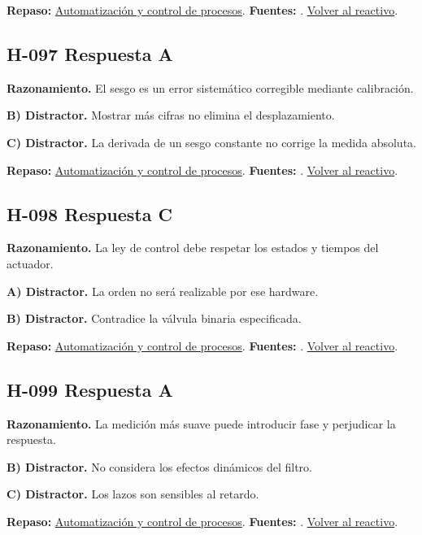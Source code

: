 \textbf{Repaso:} \hyperref[sec:h4]{Automatización y control de procesos}. \textbf{Fuentes:} \cite{control,signals,pid}. \hyperref[q:H-096]{Volver al reactivo}.\par\medskip

\subsection*{H-097 \quad Respuesta A}\label{s:H-097}
\textbf{Razonamiento.} El sesgo es un error sistemático corregible mediante calibración.

\textbf{B) Distractor. }Mostrar más cifras no elimina el desplazamiento.

\textbf{C) Distractor. }La derivada de un sesgo constante no corrige la medida absoluta.

\textbf{Repaso:} \hyperref[sec:h4]{Automatización y control de procesos}. \textbf{Fuentes:} \cite{control,signals,pid}. \hyperref[q:H-097]{Volver al reactivo}.\par\medskip

\subsection*{H-098 \quad Respuesta C}\label{s:H-098}
\textbf{Razonamiento.} La ley de control debe respetar los estados y tiempos del actuador.

\textbf{A) Distractor. }La orden no será realizable por ese hardware.

\textbf{B) Distractor. }Contradice la válvula binaria especificada.

\textbf{Repaso:} \hyperref[sec:h4]{Automatización y control de procesos}. \textbf{Fuentes:} \cite{control,signals,pid}. \hyperref[q:H-098]{Volver al reactivo}.\par\medskip

\subsection*{H-099 \quad Respuesta A}\label{s:H-099}
\textbf{Razonamiento.} La medición más suave puede introducir fase y perjudicar la respuesta.

\textbf{B) Distractor. }No considera los efectos dinámicos del filtro.

\textbf{C) Distractor. }Los lazos son sensibles al retardo.

\textbf{Repaso:} \hyperref[sec:h4]{Automatización y control de procesos}. \textbf{Fuentes:} \cite{control,signals,pid}. \hyperref[q:H-099]{Volver al reactivo}.\par\medskip

